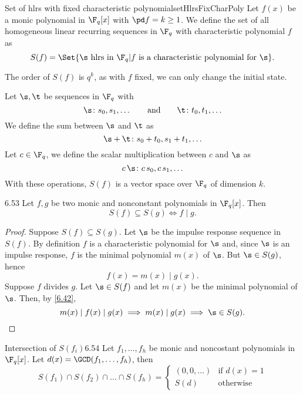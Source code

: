 \begin{defn}{Set of hlrs with fixed characteristic polynomial}{setHlrsFixCharPoly}
	Let \(f(x)\) be a monic polynomial in \(\F_q[x]\) with \(\pd f = k \ge 1\). We define the set of all homogeneous linear recurring sequences in \(\F_q\) with characteristic polynomial \(f\) as
	\[
		S(f) = \Set{\s \text{ hlrs in }\F_q | f \text{ is a characteristic polynomial for }\s}.
	\]
\end{defn}

\begin{oss}
	The order of \(S(f)\) is \(q^k\), as with \(f\) fixed, we can only change the initial state.
\end{oss}

\begin{oss}
	Let \(\s,\t\) be sequences in \(\F_q\) with
	\[
		\s\colon s_0,s_1,\ldots \qquad\text{and}\qquad \t\colon t_0,t_1,\ldots
	\]
	We define the sum between \(\s\) and \(\t\) as
	\[
		\s+\t\colon s_0+t_0,s_1+t_1,\ldots
	\]
	Let \(c\in \F_q\), we define the scalar multiplication between \(c\) and \(\s\) as
	\[
		c\,\s\colon c\,s_0,c\,s_1,\ldots
	\]
	With these operations, \(S(f)\) is a vector space over \(\F_q\) of dimension \(k\).
\end{oss}

\begin{teor}{}{6.53}
	Let \(f,g\) be two monic and nonconstant polynomials in \(\F_q[x]\). Then
	\[
		S(f) \subseteq S(g) \iff f \mid g.
	\]
\end{teor}

\begin{proof}
	Suppose \(S(f)\subseteq S(g)\). Let \(\s\) be the impulse response sequence in \(S(f)\). By definition \(f\) is a characteristic polynomial for \(\s\) and, since \(\s\) is an impulse response, \(f\) is the minimal polynomial \(m(x)\) of \(\s\). But \(\s\in S(g)\), hence
	\[
		f(x) = m(x) \mid g(x).
	\]
	Suppose \(f\) divides \(g\). Let \(\s\in S(f)\) and let \(m(x)\) be the minimal polynomial of \(\s\). Then, by \autoref{6.42},
	\[
		m(x) \mid f(x) \mid g(x) \implies m(x) \mid g(x) \implies \s \in S(g).
	\]
\end{proof}

\begin{teor}{Intersection of \(S(f_i)\)}{6.54}
	Let \(f_1,\ldots,f_h\) be monic and noncostant polynomials in \(\F_q[x]\). Let \(d(x) = \GCD(f_1,\ldots,f_h)\), then
	\[
		S(f_1) \cap S(f_2) \cap \ldots \cap S(f_h) =
		\begin{cases}
			(0,0,\ldots) & \text{if }d(x)=1 \\
			S(d)         & \text{otherwise}
		\end{cases}
	\]
\end{teor}

